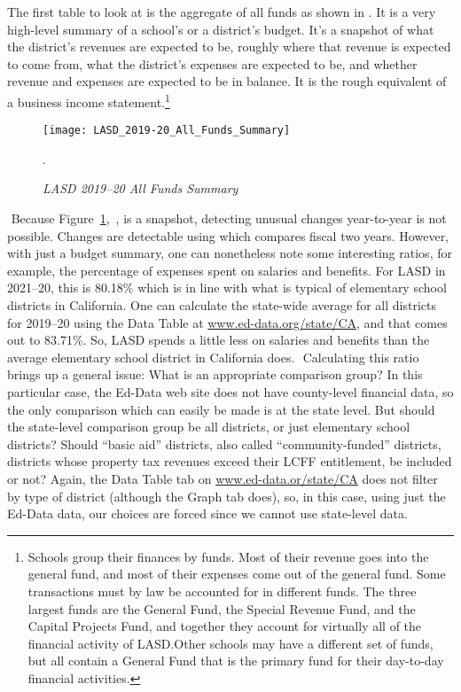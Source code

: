     The first table to look at is the aggregate of all funds as shown in . It is a very high-level summary of a school's or a district's budget. It's a snapshot of what the district's revenues are expected to be, roughly where that revenue is expected to come from, what the district's expenses are expected to be, and whether revenue and expenses are expected to be in balance. It is the rough equivalent of a business income statement.\footnote{Schools group their finances by funds. Most of their revenue goes into the general fund, and most of their expenses come out of the general fund. Some transactions must by law be accounted for in different funds. The three largest funds are the General Fund, the Special Revenue Fund, and the Capital Projects Fund, and together they account for virtually all of the financial activity of LASD.\@ Other schools may have a different set of funds, but all contain a General Fund that is the primary fund for their day-to-day financial activities.}
    ﻿
    \begin{figure}
      \centering
      \caption[LASD 2019–20 All Funds Summary]{\textit{LASD 2019–20 All Funds Summary}}\label{fig:LASD_All_Funds_Summary}
      \texttt{[image: LASD\_2019-20\_All\_Funds\_Summary]}\\ %
      \footnotesize\raggedright\textcite[38]{Kenyon2019}.
    \end{figure}
    ﻿
    Because Figure~\ref{fig:LASD_All_Funds_Summary},~, is a snapshot, detecting unusual changes year-to-year is not possible. Changes are detectable using   which compares fiscal two years. However, with just a budget summary, one can nonetheless note some interesting ratios, for example, the percentage of expenses spent on salaries and benefits. For LASD in 2021–20, this is 80.18\% which is in line with what is typical of elementary school districts in California. One can calculate the state-wide average for all districts for 2019–20 using the Data Table at \url{www.ed-data.org/state/CA}, and that comes out to 83.71\%. So, LASD spends a little less on salaries and benefits than the average elementary school district in California does.
    ﻿
    Calculating this ratio brings up a general issue: What is an appropriate comparison group? In this particular case, the Ed-Data web site does not have county-level financial data, so the only comparison which can easily be made is at the state level. But should the state-level comparison group be all districts, or just elementary school districts? Should ``basic aid'' districts, also called ``community-funded'' districts, districts whose property tax revenues exceed their LCFF entitlement, be included or not? Again, the Data Table tab on \url{www.ed-data.or/state/CA} does not filter by type of district (although the Graph tab does), so, in this case, using just the Ed-Data data, our choices are forced since we cannot use state-level data.
